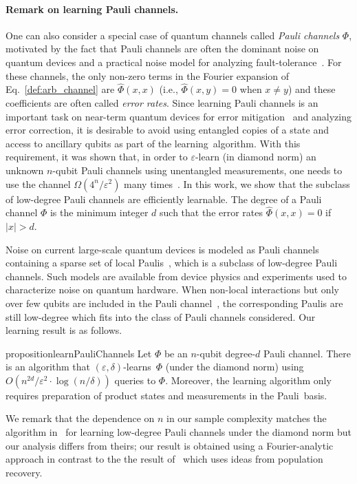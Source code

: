 \documentclass[11pt]{article}
\theoremstyle{plain}
\theoremstyle{plain}
\theoremstyle{definition}
\theoremstyle{remark}
\theoremstyle{named}
\begin{document}
\paragraph{Remark on learning Pauli channels.} One can also consider a special case of quantum channels called \emph{Pauli channels} $\Phi$, motivated by the fact that Pauli channels are often the dominant noise on quantum devices and a practical noise model for analyzing fault-tolerance~\cite{terhal2015qec}. For these channels, the only non-zero terms in the Fourier expansion of Eq.~\eqref{def:arb_channel} are $\widehat{\Phi}(x,x)$ (i.e., $\widehat{\Phi}(x,y)=0$ when $x\neq y$) and these coefficients are often called \emph{error rates}. Since learning Pauli channels is an important task on near-term quantum devices for error mitigation~\cite{van2023probabilistic} and analyzing error correction, it is desirable to avoid using entangled copies of a state and access to ancillary qubits as part of the learning~algorithm.  With this requirement, it was shown that, in order to $\varepsilon$-learn (in diamond norm) an unknown  $n$-qubit Pauli channels using unentangled measurements, one needs to use the channel  $\Omega(4^n/\varepsilon^2)$ many times~\cite{fawzi2023lower}. In this work, we show that the subclass of low-degree Pauli channels are efficiently learnable. The degree of a Pauli channel $\Phi$ is the minimum integer $d$ such that the error rates $\widehat{\Phi}(x,x)=0$ if $|x|>d$.

Noise on current large-scale quantum devices is modeled as Pauli channels containing a sparse set of local Paulis~\cite{van2023probabilistic}, which is a subclass of low-degree Pauli channels. Such models are available from device physics and experiments used to characterize noise on quantum hardware. When non-local interactions but only over few qubits are included in the Pauli channel~\cite{tran2023locality}, the corresponding Paulis are still low-degree which fits into the class of Pauli channels considered. Our learning result is as follows.

\begin{restatable}{proposition}{learnPauliChannels}\label{theo:learnPauliChannels}
    Let $\Phi$ be an $n$-qubit degree-$d$ Pauli channel. There is an algorithm that $(\varepsilon,
    \delta)$-learns~$\Phi$ (under the diamond norm) using $O\left(n^{2d}/{\varepsilon^2} \cdot \log(n/{\delta}) \right)$ queries to $\Phi$. Moreover, the learning algorithm only requires preparation of  product states and measurements in the Pauli~basis.
\end{restatable}
We remark that the dependence on $n$ in our sample complexity matches  the algorithm in~\cite{flammia2021pauli} for learning low-degree Pauli channels under the diamond norm but our analysis differs from theirs; our result is obtained using a Fourier-analytic approach in contrast to the the result of~\cite{flammia2021pauli} which uses ideas from population recovery. 
\end{document}
